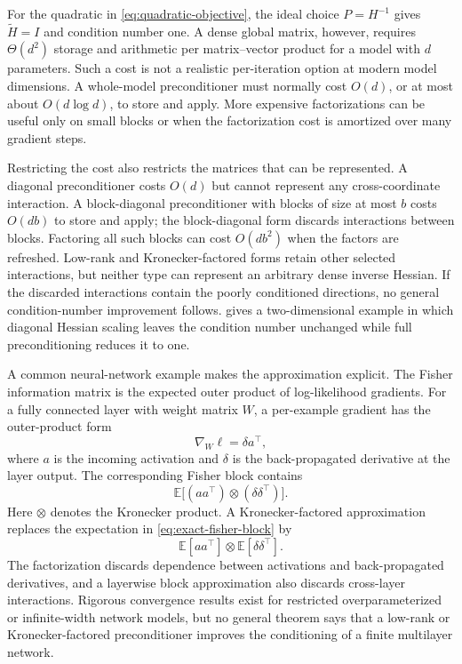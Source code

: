 \documentclass[11pt,twoside]{article}
\newcommand{\E}{\mathbb E}
\theoremstyle{definition}
\theoremstyle{remark}
\begin{document}
For the quadratic in \cref{eq:quadratic-objective}, the ideal choice
$P=H^{-1}$ gives $\widetilde H=I$ and condition number one. A dense global
matrix, however, requires $\Theta(d^2)$ storage and arithmetic per
matrix--vector product for a model with $d$ parameters. Such a cost is not a
realistic per-iteration option at modern model dimensions. A whole-model
preconditioner must normally cost $O(d)$, or at most about $O(d\log d)$, to
store and apply. More expensive factorizations can be useful only on small
blocks or when the factorization cost is amortized over many gradient steps.

Restricting the cost also restricts the matrices that can be represented. A diagonal
preconditioner costs $O(d)$ but cannot represent any cross-coordinate
interaction. A block-diagonal preconditioner with blocks of size at most $b$
costs $O(db)$ to store and apply; the block-diagonal form discards
interactions between blocks.
Factoring all such blocks can cost $O(db^2)$ when the factors are refreshed.
Low-rank and Kronecker-factored forms retain other selected interactions, but
neither type can represent an arbitrary dense inverse Hessian. If the
discarded interactions contain the poorly conditioned directions, no general
condition-number improvement follows. 
gives a two-dimensional example in which diagonal Hessian scaling leaves the
condition number unchanged while full preconditioning reduces it to one.

A common neural-network example makes the approximation explicit. The Fisher
information matrix is the expected outer product of log-likelihood gradients.
For a fully connected layer with weight matrix $W$, a per-example gradient has
the outer-product form
\[
 \nabla_W\ell=\delta a^\top,
\]
where $a$ is the incoming activation and $\delta$ is the back-propagated
derivative at the layer output. The corresponding Fisher block contains
\begin{equation}
\E\bigl[(aa^\top)\otimes(\delta\delta^\top)\bigr].
 \label{eq:exact-fisher-block}
\end{equation}
Here $\otimes$ denotes the Kronecker product.
A Kronecker-factored approximation replaces the expectation in
\cref{eq:exact-fisher-block} by
\begin{equation}
 \E[aa^\top]\otimes\E[\delta\delta^\top].
 \label{eq:kfac-block}
\end{equation}
The factorization discards dependence between activations and
back-propagated derivatives, and a layerwise block approximation also
discards cross-layer interactions. Rigorous convergence results exist for
restricted overparameterized or infinite-width network models, but no
general theorem says that a low-rank or Kronecker-factored preconditioner
improves the conditioning of a finite multilayer network.
\end{document}
